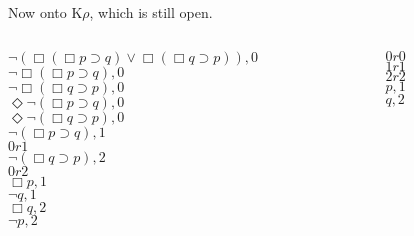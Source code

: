 \documentclass[
  14pt,
  letterpaper,
  ignorenonframetext,
]{beamer}
\begin{document}
\begin{frame}
Now onto K\(\rho\), which is still open.

\begin{columns}[T]
\begin{column}{0.65\textwidth}
\begin{center}
$\neg(\Box(\Box p \supset q) \vee \Box(\Box q \supset p)), 0$ \\
$\neg \Box(\Box p \supset q), 0$ \\
$\neg \Box(\Box q \supset p), 0$ \\
$\Diamond \neg(\Box p \supset q), 0$ \\
$\Diamond \neg(\Box q \supset p), 0$ \\
$\neg(\Box p \supset q), 1$ \\
$0r1$ \\
$\neg(\Box q \supset p), 2$ \\
$0r2$ \\
$\Box p, 1$ \\
$\neg q, 1$ \\
$\Box q, 2$ \\
$\neg p, 2$ \\
\end{center}
\end{column}

\begin{column}{0.35\textwidth}
\begin{center}
$0r0$ \\
$1r1$ \\
$2r2$ \\
$p, 1$ \\
$q, 2$
\end{center}
\end{column}
\end{columns}
\end{frame}
\end{document}
